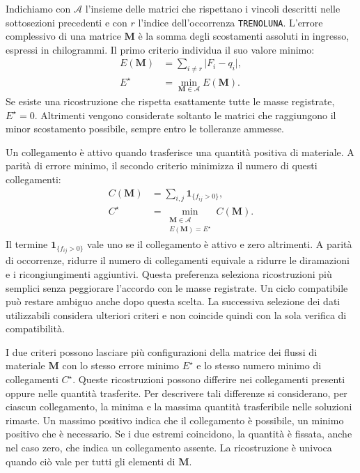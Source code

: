 Indichiamo con $\mathcal{A}$ l'insieme delle matrici che rispettano i vincoli descritti nelle sottosezioni precedenti e con $r$ l'indice dell'occorrenza \texttt{TRENOLUNA}. L'errore complessivo di una matrice $\bm{M}$ è la somma degli scostamenti assoluti in ingresso, espressi in chilogrammi. Il primo criterio individua il suo valore minimo:
\begin{equation}
\label{eq:minimum-mass-discrepancy}
\begin{aligned}
E(\bm{M}) &= \sum_{i\neq r}\lvert F_i-q_i\rvert, \\
E^{\star} &= \min_{\bm{M}\in\mathcal{A}} E(\bm{M}).
\end{aligned}
\end{equation}
Se esiste una ricostruzione che rispetta esattamente tutte le masse registrate, $E^{\star}=0$. Altrimenti vengono considerate soltanto le matrici che raggiungono il minor scostamento possibile, sempre entro le tolleranze ammesse.

Un collegamento è attivo quando trasferisce una quantità positiva di materiale. A parità di errore minimo, il secondo criterio minimizza il numero di questi collegamenti:
\begin{equation}
\label{eq:minimum-active-links}
\begin{aligned}
C(\bm{M}) &= \sum_{i,j}\mathbf{1}_{\{f_{ij}>0\}}, \\
C^{\star} &= \min_{\substack{\bm{M}\in\mathcal{A}\\E(\bm{M})=E^{\star}}} C(\bm{M}).
\end{aligned}
\end{equation}
Il termine $\mathbf{1}_{\{f_{ij}>0\}}$ vale uno se il collegamento è attivo e zero altrimenti. A parità di occorrenze, ridurre il numero di collegamenti equivale a ridurre le diramazioni e i ricongiungimenti aggiuntivi. Questa preferenza seleziona ricostruzioni più semplici senza peggiorare l'accordo con le masse registrate. Un ciclo compatibile può restare ambiguo anche dopo questa scelta. La successiva selezione dei dati utilizzabili considera ulteriori criteri e non coincide quindi con la sola verifica di compatibilità.

I due criteri possono lasciare più configurazioni della matrice dei flussi di materiale $\bm{M}$ con lo stesso errore minimo $E^{\star}$ e lo stesso numero minimo di collegamenti $C^{\star}$. Queste ricostruzioni possono differire nei collegamenti presenti oppure nelle quantità trasferite. Per descrivere tali differenze si considerano, per ciascun collegamento, la minima e la massima quantità trasferibile nelle soluzioni rimaste. Un massimo positivo indica che il collegamento è possibile, un minimo positivo che è necessario. Se i due estremi coincidono, la quantità è fissata, anche nel caso zero, che indica un collegamento assente. La ricostruzione è univoca quando ciò vale per tutti gli elementi di $\bm{M}$.

